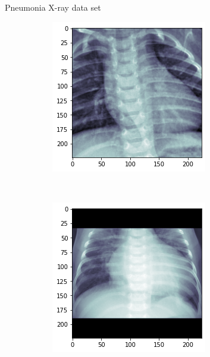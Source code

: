 \begin{frame}{Pneumonia X-ray data set}
\begin{figure}[htbp!]
\begin{subfigure}[b]{0.3\textwidth}
     \end{subfigure}
     \hfill
     \begin{subfigure}[b]{0.3\textwidth}
         \centering
         \includegraphics[width=\textwidth]{Images/xray_normal4.png}
     \end{subfigure}
     \hfill
     \\
     \begin{subfigure}[b]{0.3\textwidth}
         \centering
         \includegraphics[width=\textwidth]{Images/xray_pneumonia1.png}

\end{subfigure}
\end{figure}
\end{frame}
